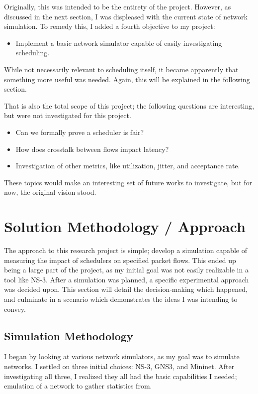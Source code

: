 \documentclass[conference]{IEEEtran}
\begin{document}
    Originally, this was intended to be the entirety of the project.
    However, as discussed in the next section, I was displeased with the current state of network simulation.
    To remedy this, I added a fourth objective to my project:
    \begin{itemize}
        \item Implement a basic network simulator capable of easily investigating scheduling.
    \end{itemize}

    While not necessarily relevant to scheduling itself, it became apparently that something more useful was needed.
    Again, this will be explained in the following section.

    That is also the total scope of this project; the following questions are interesting, but were not investigated for
    this project.

    \begin{itemize}
        \item Can we formally prove a scheduler is fair?
        \item How does crosstalk between flows impact latency?
        \item Investigation of other metrics, like utilization, jitter, and acceptance rate.
    \end{itemize}

    These topics would make an interesting set of future works to investigate, but for now, the original vision stood.

    \section{Solution Methodology / Approach} \label{sec:approach}
    The approach to this research project is simple; develop a simulation capable of measuring the impact of schedulers
on specified packet flows.
    This ended up being a large part of the project, as my initial goal was not easily realizable
in a tool like NS-3.
After a simulation was planned, a specific experimental approach was decided upon.
This section will detail the decision-making which happened, and culminate in a scenario which demonstrates the ideas
I was intending to convey.

    \subsection{Simulation Methodology}
I began by looking at various network simulators, as my goal was to simulate networks.
I settled on three initial choices: NS-3, GNS3, and Mininet.
After investigating all three, I realized they all had the basic capabilities I needed; emulation of a network to gather
statistics from.
\end{document}
